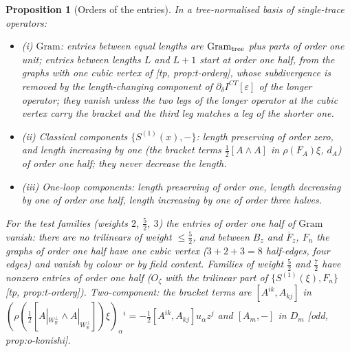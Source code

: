 \documentclass[11pt]{report}
\theoremstyle{plain}
\newtheorem{proposition}[theorem]{Proposition}
\theoremstyle{definition}
\numberwithin{equation}{chapter}
\newcommand{\Wp}{W_{\mathbb R}^\perp}
\newcommand{\Gt}{\mathrm{Gram}_{\rm tree}}
\begin{document}
\begin{proposition}[Orders of the entries]
\label{prop:ip-orders}
In a tree-normalised basis of single-trace operators:
\begin{itemize}
\item (i) $\mathrm{Gram}$: entries between equal lengths are $\Gt$ plus parts of order one unit; entries between lengths $L$ and $L+1$ start at order one half, from the graphs with one cubic vertex of [tp, prop:t-orderg], whose subdivergence is removed by the length-changing component of $\partial_\delta I^{CT}[\varepsilon]$ of the longer operator; they vanish unless the two legs of the longer operator at the cubic vertex carry the bracket and the third leg matches a leg of the shorter one.
\item (ii) Classical components $\{S^{(1)}(x),-\}$: length preserving of order zero, and length increasing by one (the bracket terms $\tfrac12[A\wedge A]$ in $\rho(F_A)\xi$, $d_A$) of order one half; they never decrease the length.
\item (iii) One-loop components: length preserving of order one, length decreasing by one of order one half, length increasing by one of order three halves.
\end{itemize}
For the test families (weights $2$, $\tfrac52$, $3$) the entries of order one half of $\mathrm{Gram}$ vanish: there are no trilinears of weight $\le\tfrac52$, and between $B_z$ and $\overline F_z$, $F_n$ the graphs of order one half have one cubic vertex ($3+2+3=8$ half-edges, four edges) and vanish by colour or by field content. Families of weight $\tfrac52$ and $\tfrac72$ have nonzero entries of order one half ($O_\zeta$ with the trilinear part of $\{S^{(1)}(\xi),F_n\}$ [tp, prop:t-orderg]). Two-component: the bracket terms are $[A^{ik},A_{kj}]$ in $(\rho(\tfrac12[A|_{\Wp}\wedge A|_{\Wp}])\xi)_\alpha{}^i=-\tfrac12[A^{ik},A_{kj}]u_\alpha z^j$ and $[A_m,-]$ in $D_m$ [odd, prop:o-konishi].
\end{proposition}
\end{document}
